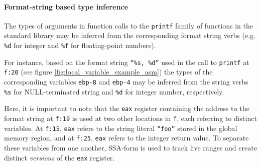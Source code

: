 
\paragraph{Format-string based type inference}

The types of arguments in function calls to the \texttt{printf} family of functions in the standard library may be inferred from the corresponding format string verbs (e.g. \texttt{\%d} for integer and \texttt{\%f} for floating-point numbers).

For instance, based on the format string \texttt{``\%s, \%d''} used in the call to \texttt{printf} at \texttt{f:20} (see figure \ref{fig:local_variable_example_asm}) the types of the corresponding variables \texttt{ebp-8} and \texttt{ebp-4} may be inferred from the string verbs \texttt{\%s} for NULL-terminated string and \texttt{\%d} for integer number, respectively.

Here, it is important to note that the \texttt{eax} register containing the address to the format string at \texttt{f:19} is used at two other locations in \texttt{f}, each referring to distinct variables. At \texttt{f:15}, \texttt{eax} refers to the string literal \texttt{``foo''} stored in the global memory region, and at \texttt{f:25}, \texttt{eax} refers to the integer return value. To separate these variables from one another, SSA-form is used to track live ranges and create distinct \textit{versions} of the \texttt{eax} register.

